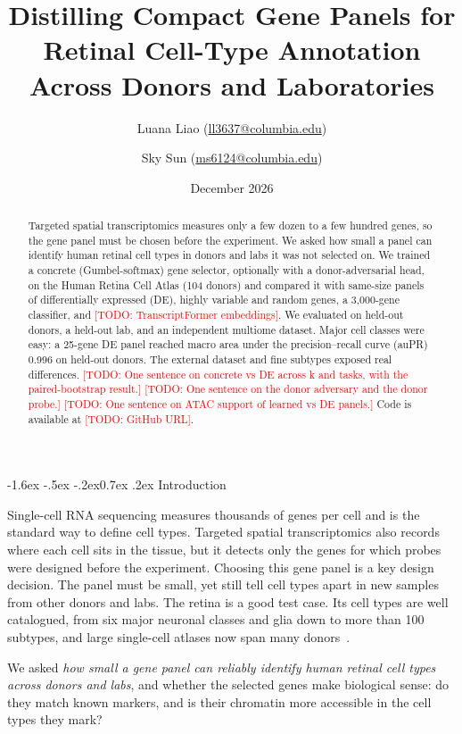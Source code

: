 \documentclass[11pt]{article}
\title{\Large\bfseries Distilling Compact Gene Panels for Retinal Cell-Type Annotation\\
       Across Donors and Laboratories}
\author{Luana Liao (\href{mailto:ll3637@columbia.edu}{ll3637@columbia.edu}) \and
        Sky Sun (\href{mailto:ms6124@columbia.edu}{ms6124@columbia.edu})}
\date{December 2026}
\makeatletter
\renewcommand\section{\@startsection{section}{1}{\z@}%
    {-1.6ex \@plus -.5ex \@minus -.2ex}{0.7ex \@plus .2ex}%
    {\normalfont\large\bfseries}}
\newcommand{\todo}[1]{\textcolor{red}{[TODO: #1]}}
\makeatother
\begin{document}
\maketitle
\vspace{-1.5em}

\begin{abstract}
\noindent
Targeted spatial transcriptomics measures only a few dozen to a few hundred genes, so the
gene panel must be chosen before the experiment. We asked how small a panel can identify
human retinal cell types in donors and labs it was not selected on. We trained a concrete
(Gumbel-softmax) gene selector, optionally with a donor-adversarial head, on the Human
Retina Cell Atlas (104 donors) and compared it with same-size panels of differentially
expressed (DE), highly variable and random genes, a 3{,}000-gene classifier, and
\todo{TranscriptFormer embeddings}. We evaluated on held-out donors, a held-out lab, and an
independent multiome dataset. Major cell classes were easy: a 25-gene DE panel reached
macro area under the precision--recall curve (auPR) 0.996 on held-out donors. The external
dataset and fine subtypes exposed real differences. \todo{One sentence on concrete vs DE
across k and tasks, with the paired-bootstrap result.} \todo{One sentence on the donor
adversary and the donor probe.} \todo{One sentence on ATAC support of learned vs DE panels.}
Code is available at \todo{GitHub URL}.
\end{abstract}

\section{Introduction}

Single-cell RNA sequencing measures thousands of genes per cell and is the standard way to
define cell types. Targeted spatial transcriptomics also records where each cell sits in the
tissue, but it detects only the genes for which probes were designed before the experiment.
Choosing this gene panel is a key design decision. The panel must be small, yet still tell
cell types apart in new samples from other donors and labs. The retina is a good test case.
Its cell types are well catalogued, from six major neuronal classes and glia down to more
than 100 subtypes, and large single-cell atlases now span many donors~\cite{li2026}.

We asked \emph{how small a gene panel can reliably identify human retinal cell types across
donors and labs}, and whether the selected genes make biological sense: do they match known
markers, and is their chromatin more accessible in the cell types they mark?
\end{document}
